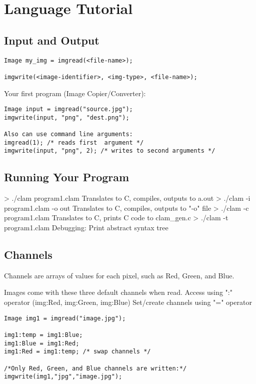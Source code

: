\chapter{Language Tutorial}

\section{Input and Output}
\begin{lstlisting}[language=CLAM,escapechar=\%]
Image my_img = imgread(<file-name>);

imgwrite(<image-identifier>, <img-type>, <file-name>);
\end{lstlisting}

Your first program (Image Copier/Converter):

\begin{lstlisting}[language=CLAM,escapechar=\%]
Image input = imgread("source.jpg");
imgwrite(input, "png", "dest.png");

Also can use command line arguments:
imgread(1); /* reads first  argument */
imgwrite(input, "png", 2); /* writes to second arguments */
\end{lstlisting}

\section{Running Your Program}

> ./clam program1.clam
Translates to C, compiles, outputs to a.out
> ./clam -i program1.clam -o out
Translates to C, compiles, outputs to "-o" file
> ./clam -c program1.clam
Translates to C, prints C code to clam_gen.c
> ./clam -t program1.clam
Debugging: Print abstract syntax tree

\section{Channels}

Channels are arrays of values for each pixel, such as Red, Green, and Blue.

Images come with these three default channels when read.
Access using ":" operator (img:Red, img:Green, img:Blue)
Set/create channels using "=" operator

\begin{lstlisting}[language=CLAM,escapechar=\%]
Image img1 = imgread("image.jpg");

img1:temp = img1:Blue;
img1:Blue = img1:Red;
img1:Red = img1:temp; /* swap channels */

/*Only Red, Green, and Blue channels are written:*/
imgwrite(img1,"jpg","image.jpg");
\end{lstlisting}


